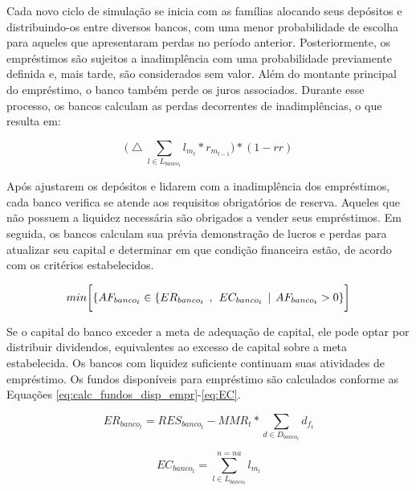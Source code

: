 \documentclass[hidelinks, article,12pt,oneside,a4paper,english,brazil,sumario=tradicional]{abntex2}
\begin{document}
Cada novo ciclo de simulação se inicia com as famílias alocando seus depósitos e distribuindo-os entre diversos bancos, com uma menor probabilidade de escolha para aqueles que apresentaram perdas no período anterior. Posteriormente, os empréstimos são sujeitos a inadimplência com uma probabilidade previamente definida e, mais tarde, são considerados sem valor. Além do montante principal do empréstimo, o banco também perde os juros associados. Durante esse processo, os bancos calculam as perdas decorrentes de inadimplências, o que resulta em:

\begin{equation} \label{eq:perdas_incumprim}
\biggl( \bigtriangleup \sum_{l \in L_{banco_{t}}} l_{m_{t}} * r_{m_{t-1}} \biggl) * (1 - rr)
\end{equation}

Após ajustarem os depósitos e lidarem com a inadimplência dos empréstimos, cada banco verifica se atende aos requisitos obrigatórios de reserva. Aqueles que não possuem a liquidez necessária são obrigados a vender seus empréstimos. Em seguida, os bancos calculam sua prévia demonstração de lucros e perdas para atualizar seu capital e determinar em que condição financeira estão, de acordo com os critérios estabelecidos. 


\begin{equation} \label{eq:calc_fundos_disp_empr}
min \biggl[\{AF_{banco_{t}} \in \{ ER_{banco_{t}}  \hspace{1.5mm} ,  \hspace{1.5mm} EC_{banco_{t}}  \hspace{1.5mm} |   \hspace{1.5mm}AF_{banco_{t}} > 0 \}\biggl]
\end{equation}


Se o capital do banco exceder a meta de adequação de capital, ele pode optar por distribuir dividendos, equivalentes ao excesso de capital sobre a meta estabelecida. Os bancos com liquidez suficiente continuam suas atividades de empréstimo. Os fundos disponíveis para empréstimo são calculados conforme as Equações \ref{eq:calc_fundos_disp_empr}-\ref{eq:EC}.  

\begin{equation} \label{eq:ER}
 ER_{banco_{t}} = RES_{banco_{t}} - MMR_{t} * \sum_{d \in D_{banco_{t}}} d_{f_{t}}
\end{equation}

\begin{equation} \label{eq:EC}
 EC_{banco_{t}} = \sum^{n=na}_{l \in L_{banco_{t}}} l_{m_{t}}
\end{equation}
\end{document}
